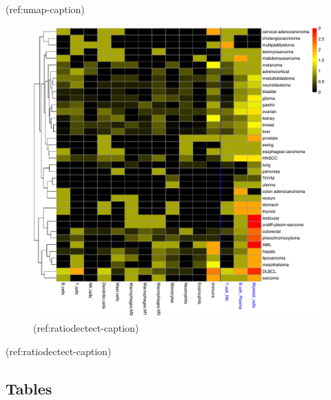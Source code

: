 \documentclass[12pt,]{book}
\theoremstyle{definition}
\theoremstyle{definition}
\theoremstyle{definition}
\theoremstyle{remark}
\begin{document}
(ref:umap-caption)

\begin{figure}

{\centering \includegraphics[width=1\linewidth]{figures-ext/ration_only_immune} 

}

\caption[Ratio of detected components by cancer type]{(ref:ratiodectect-caption)}\label{fig:ratiodectect}
\end{figure}

(ref:ratiodectect-caption)

\hypertarget{tables}{%
\subsection{Tables}\label{tables}}

\begingroup\fontsize{7}{9}\selectfont{}
\end{document}
